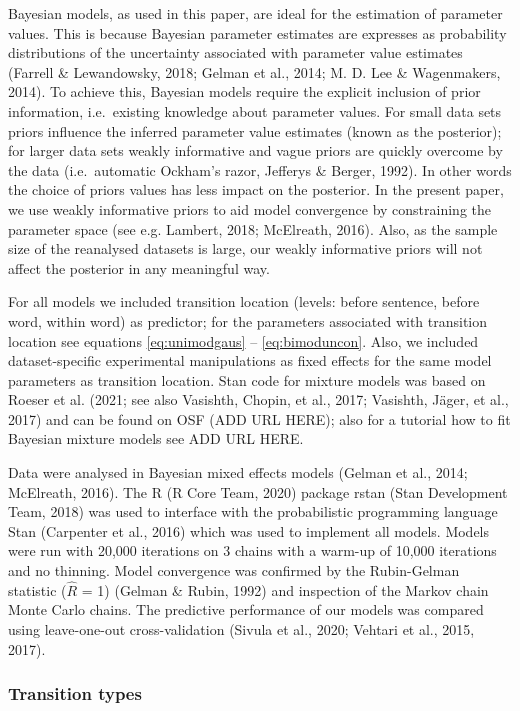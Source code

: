\documentclass[
  english,
  man,floatsintext]{apa7}
\begin{document}
Bayesian models, as used in this paper, are ideal for the estimation of parameter values. This is because Bayesian parameter estimates are expresses as probability distributions of the uncertainty associated with parameter value estimates (Farrell \& Lewandowsky, 2018; Gelman et al., 2014; M. D. Lee \& Wagenmakers, 2014). To achieve this, Bayesian models require the explicit inclusion of prior information, i.e.~existing knowledge about parameter values. For small data sets priors influence the inferred parameter value estimates (known as the posterior); for larger data sets weakly informative and vague priors are quickly overcome by the data (i.e.~automatic Ockham's razor, Jefferys \& Berger, 1992). In other words the choice of priors values has less impact on the posterior. In the present paper, we use weakly informative priors to aid model convergence by constraining the parameter space (see e.g. Lambert, 2018; McElreath, 2016). Also, as the sample size of the reanalysed datasets is large, our weakly informative priors will not affect the posterior in any meaningful way.

For all models we included transition location (levels: before sentence, before word, within word) as predictor; for the parameters associated with transition location see equations \ref{eq:unimodgaus} -- \ref{eq:bimoduncon}. Also, we included dataset-specific experimental manipulations as fixed effects for the same model parameters as transition location. Stan code for mixture models was based on Roeser et al. (2021; see also Vasishth, Chopin, et al., 2017; Vasishth, Jäger, et al., 2017) and can be found on OSF (ADD URL HERE); also for a tutorial how to fit Bayesian mixture models see ADD URL HERE.

Data were analysed in Bayesian mixed effects models (Gelman et al., 2014; McElreath, 2016). The R (R Core Team, 2020) package rstan (Stan Development Team, 2018) was used to interface with the probabilistic programming language Stan (Carpenter et al., 2016) which was used to implement all models. Models were run with 20,000 iterations on 3 chains with a warm-up of 10,000 iterations and no thinning. Model convergence was confirmed by the Rubin-Gelman statistic (\(\hat{R}\) = 1) (Gelman \& Rubin, 1992) and inspection of the Markov chain Monte Carlo chains. The predictive performance of our models was compared using leave-one-out cross-validation (Sivula et al., 2020; Vehtari et al., 2015, 2017).

\hypertarget{transition-types}{%
\subsubsection{Transition types}\label{transition-types}}
\end{document}
